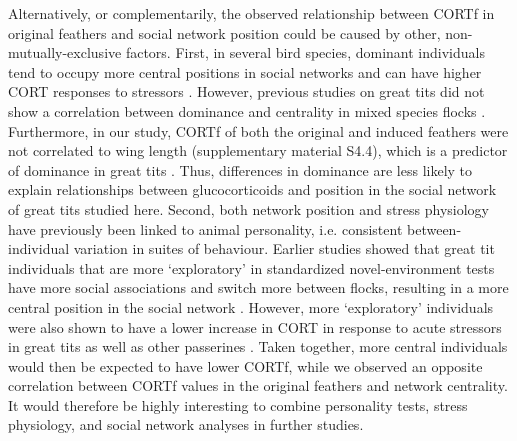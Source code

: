 \documentclass[10pt, twoside]{book} %
\begin{document}
Alternatively, or complementarily, the observed relationship between CORTf in original feathers and social network position could be caused by other, non-mutually-exclusive factors. First, in several bird species, dominant individuals tend to occupy more central positions in social networks \citep{Krause2002} and can have higher CORT responses to stressors \citep{Pravosudov2003}. However, previous studies on great tits did not show a correlation between dominance and centrality in mixed species flocks \citep{Farine2012}. Furthermore, in our study, CORTf of both the original and induced feathers were not correlated to wing length (supplementary material S4.4), which is a predictor of dominance in great tits \citep{Sandell1991, Gosler1996}. Thus, differences in dominance are less likely to explain relationships between glucocorticoids and position in the social network of great tits studied here. Second, both network position and stress physiology have previously been linked to animal personality, i.e. consistent between-individual variation in suites of behaviour. Earlier studies showed that great tit individuals that are more `exploratory' in standardized novel-environment tests have more social associations and switch more between flocks, resulting in a more central position in the social network \citep{Aplin2013, Snijders2014}. However, more `exploratory' individuals were also shown to have a lower increase in CORT in response to acute stressors in great tits \citep{Baugh2013} as well as other passerines \citep{Lendvai2011, Moyers2018}. Taken together, more central individuals would then be expected to have lower CORTf, while we observed an opposite correlation between CORTf values in the original feathers and network centrality. It would therefore be highly interesting to combine personality tests, stress physiology, and social network analyses in further studies.\\
\end{document}
